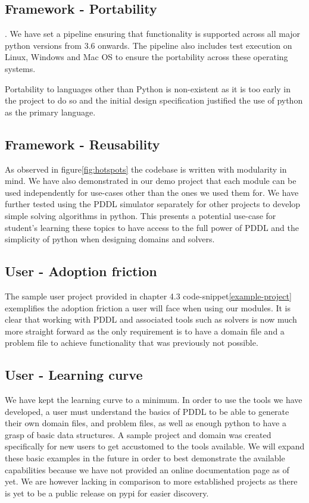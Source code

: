 \subsection{Framework - Portability}.
We have set a pipeline ensuring that functionality is supported across all major python versions from 3.6 onwards.
The pipeline also includes test execution on Linux, Windows and Mac OS to ensure the portability across these operating systems.

Portability to languages other than Python is non-existent as it is too early in the project to do so and the initial design specification justified the use of python as the primary language.

\subsection{Framework - Reusability}
As observed in figure\ref{fig:hotspots} the codebase is written with modularity in mind.
We have also demonstrated in our demo project that each module can be used independently for use-cases other than the ones we used them for.
We have further tested using the PDDL simulator separately for other projects to develop simple solving algorithms in python.
This presents a potential use-case for student's learning these topics to have access to the full power of PDDL and the simplicity of python when designing domains and solvers.

\subsection{User - Adoption friction}
The sample user project provided in chapter 4.3 code-snippet\ref{example-project} exemplifies the adoption friction a user will face when using our modules.
It is clear that working with PDDL and associated tools such as solvers is now much more straight forward as the only requirement is to have a domain file and a problem file to achieve functionality that was previously not possible.

\subsection{User - Learning curve}
We have kept the learning curve to a minimum.
In order to use the tools we have developed, a user must understand the basics of PDDL to be able to generate their own domain files, and problem files, as well as enough python to have a grasp of basic data structures.
A sample project and domain was created specifically for new users to get accustomed to the tools available.
We will expand these basic examples in the future in order to best demonstrate the available capabilities because we have not provided an online documentation page as of yet.
We are however lacking in comparison to more established projects as there is yet to be a public release on pypi for easier discovery.


